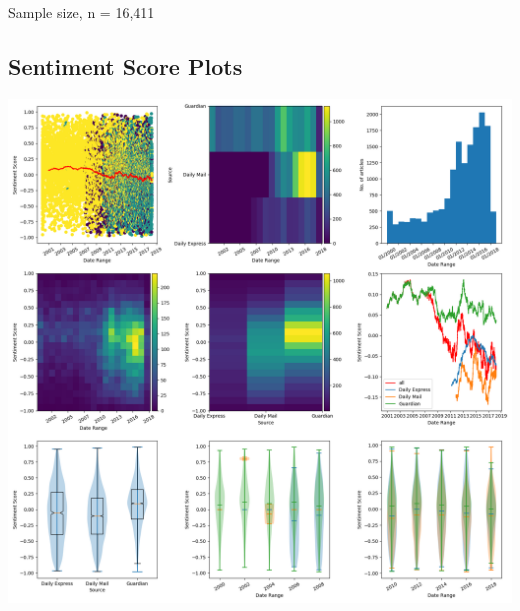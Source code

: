 \documentclass{report}
\begin{document}
\noindent Sample size, n = 16,411

\subsection{Sentiment Score Plots}
\includegraphics[width=\textwidth]{raw/disabled.png}
\end{document}
